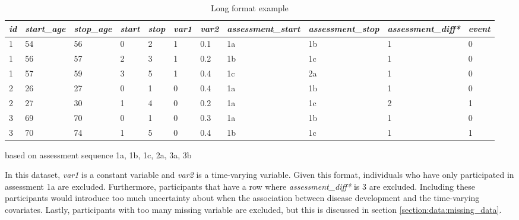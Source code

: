 \begin{table} [H]
    \centering
    \caption{Long format example}
    \begin{tabular}{|l|l|l|l|l|l|l|l|l|l|l|}
\hline
\textit{id} & \textit{start\_age} & \textit{stop\_age} & \textit{start} & \textit{stop} & \textit{var1} & \textit{var2} & \textit{assessment\_start} & \textit{assessment\_stop} & \textit{assessment\_diff*} & \textit{event} \\ \hline
1  & 54         & 56        & 0     & 2    & 1    & 0.1  & 1a                & 1b               & 1                & 0     \\ \hline
1  & 56         & 57        & 2     & 3    & 1    & 0.2  & 1b                & 1c               & 1                & 0     \\ \hline
1  & 57         & 59        & 3     & 5    & 1    & 0.4  & 1c                & 2a               & 1                & 0     \\ \hline
2  & 26         & 27        & 0     & 1    & 0    & 0.4  & 1a                & 1b               & 1                & 0     \\ \hline
2  & 27         & 30        & 1     & 4    & 0    & 0.2  & 1a                & 1c               & 2                & 1     \\ \hline
3  & 69         & 70        & 0     & 1    & 0    & 0.3  & 1a                & 1b               & 1                & 0     \\ \hline
3  & 70         & 74        & 1     & 5    & 0    & 0.4  & 1b                & 1c               & 1                & 1     \\ \hline
    \end{tabular}
    \begin{tablenotes}
        \small
        \item* based on assessment sequence 1a, 1b, 1c, 2a, 3a, 3b
      \end{tablenotes}
    \label{table:data:example_long_format}
\end{table}

In this dataset, \textit{var1} is a constant variable and \textit{var2} is a time-varying variable. Given this format, individuals who have only participated in assessment 1a are excluded. Furthermore, participants that have a row where \textit{assessment\_diff*} is 3 are excluded. Including these participants would introduce too much uncertainty about when the association between disease development and the time-varying covariates. Lastly, participants with too many missing variable are excluded, but this is discussed in section \ref{section:data:missing_data}.

